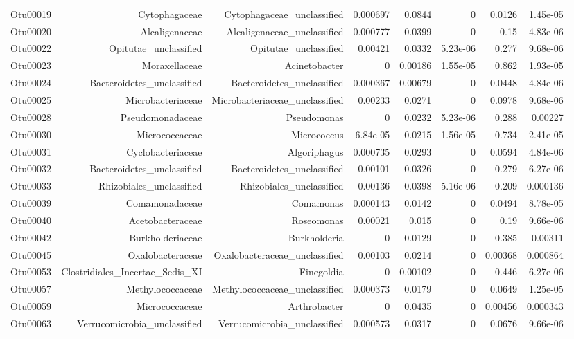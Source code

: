 \documentclass[]{article}
\begin{document}
\begin{table}[ht]
\begin{tabular}{crrrrrrr}
  Otu00019 & Cytophagaceae & Cytophagaceae\_unclassified & 0.000697 & 0.0844 & 0 & 0.0126 & 1.45e-05 \\ 
  Otu00020 & Alcaligenaceae & Alcaligenaceae\_unclassified & 0.000777 & 0.0399 & 0 & 0.15 & 4.83e-06 \\ 
  Otu00022 & Opitutae\_unclassified & Opitutae\_unclassified & 0.00421 & 0.0332 & 5.23e-06 & 0.277 & 9.68e-06 \\ 
  Otu00023 & Moraxellaceae & Acinetobacter & 0 & 0.00186 & 1.55e-05 & 0.862 & 1.93e-05 \\ 
  Otu00024 & Bacteroidetes\_unclassified & Bacteroidetes\_unclassified & 0.000367 & 0.00679 & 0 & 0.0448 & 4.84e-06 \\ 
  Otu00025 & Microbacteriaceae & Microbacteriaceae\_unclassified & 0.00233 & 0.0271 & 0 & 0.0978 & 9.68e-06 \\ 
  Otu00028 & Pseudomonadaceae & Pseudomonas & 0 & 0.0232 & 5.23e-06 & 0.288 & 0.00227 \\ 
  Otu00030 & Micrococcaceae & Micrococcus & 6.84e-05 & 0.0215 & 1.56e-05 & 0.734 & 2.41e-05 \\ 
  Otu00031 & Cyclobacteriaceae & Algoriphagus & 0.000735 & 0.0293 & 0 & 0.0594 & 4.84e-06 \\ 
  Otu00032 & Bacteroidetes\_unclassified & Bacteroidetes\_unclassified & 0.00101 & 0.0326 & 0 & 0.279 & 6.27e-06 \\ 
  Otu00033 & Rhizobiales\_unclassified & Rhizobiales\_unclassified & 0.00136 & 0.0398 & 5.16e-06 & 0.209 & 0.000136 \\ 
  Otu00039 & Comamonadaceae & Comamonas & 0.000143 & 0.0142 & 0 & 0.0494 & 8.78e-05 \\ 
  Otu00040 & Acetobacteraceae & Roseomonas & 0.00021 & 0.015 & 0 & 0.19 & 9.66e-06 \\ 
  Otu00042 & Burkholderiaceae & Burkholderia & 0 & 0.0129 & 0 & 0.385 & 0.00311 \\ 
  Otu00045 & Oxalobacteraceae & Oxalobacteraceae\_unclassified & 0.00103 & 0.0214 & 0 & 0.00368 & 0.000864 \\ 
  Otu00053 & Clostridiales\_Incertae\_Sedis\_XI & Finegoldia & 0 & 0.00102 & 0 & 0.446 & 6.27e-06 \\ 
  Otu00057 & Methylococcaceae & Methylococcaceae\_unclassified & 0.000373 & 0.0179 & 0 & 0.0649 & 1.25e-05 \\ 
  Otu00059 & Micrococcaceae & Arthrobacter & 0 & 0.0435 & 0 & 0.00456 & 0.000343 \\ 
  Otu00063 & Verrucomicrobia\_unclassified & Verrucomicrobia\_unclassified & 0.000573 & 0.0317 & 0 & 0.0676 & 9.66e-06 \\ 

\end{tabular}
\end{table}
\end{document}
